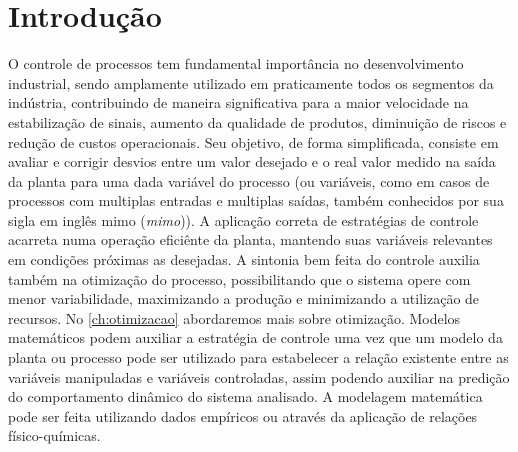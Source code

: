 \chapter{Introdução}

O controle de processos tem fundamental importância no desenvolvimento industrial,
sendo amplamente utilizado em praticamente todos os segmentos da indústria,
contribuindo de maneira significativa para a maior velocidade na estabilização de sinais,
aumento da qualidade de produtos, diminuição de riscos e redução de custos operacionais.
Seu objetivo, de forma simplificada, consiste em avaliar e corrigir desvios entre um
valor desejado e o real valor medido na saída da planta para uma dada variável do
processo (ou variáveis, como em casos de processos com multiplas entradas e multiplas
saídas, também conhecidos por sua sigla em inglês \acrshort{mimo} (\textit{\acrlong{mimo}})).
A aplicação correta de estratégias de controle acarreta numa operação eficiênte da
planta, mantendo suas variáveis relevantes em condições próximas as desejadas.
A sintonia bem feita do controle auxilia também na otimização do processo,
possibilitando que o sistema opere com menor variabilidade, maximizando a produção
e minimizando a utilização de recursos. No \cref{ch:otimizacao} abordaremos mais
sobre otimização.
Modelos matemáticos podem auxiliar a estratégia de controle uma vez que um modelo da
planta ou processo pode ser utilizado para estabelecer a relação existente entre as
variáveis manipuladas e variáveis controladas, assim podendo auxiliar na predição do
comportamento dinâmico do sistema analisado. A modelagem matemática pode ser feita
utilizando dados empíricos ou através da aplicação de relações físico-químicas.

